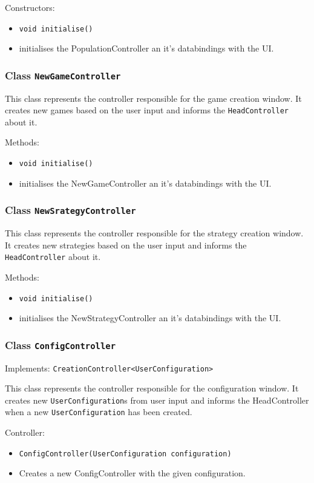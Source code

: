 \documentclass[parskip=full,11pt]{scrartcl}
\begin{document}
Constructors:
\begin{itemize}\itemsep -10pt
\item \texttt{void initialise()}
\item[] initialises the PopulationController an it's databindings with the UI.
\end{itemize}

\subsubsection{Class \texttt{NewGameController}}
This class represents the controller responsible for the game creation window.
It creates new games based on the user input and informs the \texttt{HeadController} about it.

Methods:
\begin{itemize}\itemsep -10pt
\item \texttt{void initialise()}
\item[] initialises the NewGameController an it's databindings with the UI.
\end{itemize}

\subsubsection{Class \texttt{NewSrategyController}}
This class represents the controller responsible for the strategy creation window. It creates new strategies based on the user input and informs the \texttt{HeadController} about it.

Methods:
\begin{itemize}\itemsep -10pt
\item \texttt{void initialise()}
\item[] initialises the NewStrategyController an it's databindings with the UI.
\end{itemize}

\subsubsection{Class \texttt{ConfigController}}

Implements: \texttt{CreationController<UserConfiguration>}

This class represents the controller responsible for the configuration window. It creates new \texttt{UserConfiguration}s from user input and informs the HeadController when a new \texttt{UserConfiguration} has been created.

Controller:
\begin{itemize}\itemsep -10pt
\item \texttt{ConfigController(UserConfiguration configuration)}
\item[] Creates a new ConfigController with the given configuration.
\end{itemize}
\end{document}
